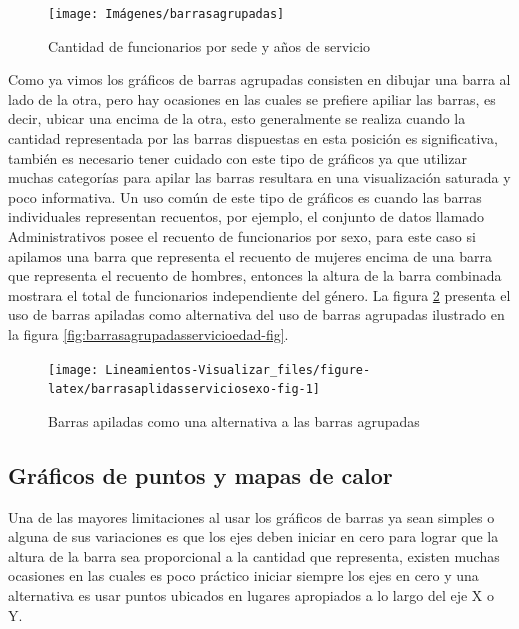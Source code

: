 \documentclass[
]{book}
\begin{document}
\begin{figure}

{\centering \texttt{[image: Imágenes/barrasagrupadas]} 

}

\caption{Cantidad de funcionarios por sede y años de servicio}\label{fig:barrasagrupadassedeservicio-fig}
\end{figure}

Como ya vimos los gráficos de barras agrupadas consisten en dibujar una barra al lado de la otra, pero hay ocasiones en las cuales se prefiere apiliar las barras, es decir, ubicar una encima de la otra, esto generalmente se realiza cuando la cantidad representada por las barras dispuestas en esta posición es significativa, también es necesario tener cuidado con este tipo de gráficos ya que utilizar muchas categorías para apilar las barras resultara en una visualización saturada y poco informativa. Un uso común de este tipo de gráficos es cuando las barras individuales representan recuentos, por ejemplo, el conjunto de datos llamado Administrativos posee el recuento de funcionarios por sexo, para este caso si apilamos una barra que representa el recuento de mujeres encima de una barra que representa el recuento de hombres, entonces la altura de la barra combinada mostrara el total de funcionarios independiente del género. La figura \ref{fig:barrasaplidasserviciosexo-fig} presenta el uso de barras apiladas como alternativa del uso de barras agrupadas ilustrado en la figura \ref{fig:barrasagrupadasservicioedad-fig}.

\begin{figure}

{\centering \texttt{[image: Lineamientos-Visualizar\_files/figure-latex/barrasaplidasserviciosexo-fig-1]} 

}

\caption{Barras apiladas como una alternativa a las barras agrupadas}\label{fig:barrasaplidasserviciosexo-fig}
\end{figure}

\hypertarget{gruxe1ficos-de-puntos-y-mapas-de-calor}{%
\subsection{Gráficos de puntos y mapas de calor}\label{gruxe1ficos-de-puntos-y-mapas-de-calor}}

Una de las mayores limitaciones al usar los gráficos de barras ya sean simples o alguna de sus variaciones es que los ejes deben iniciar en cero para lograr que la altura de la barra sea proporcional a la cantidad que representa, existen muchas ocasiones en las cuales es poco práctico iniciar siempre los ejes en cero y una alternativa es usar puntos ubicados en lugares apropiados a lo largo del eje X o Y.
\end{document}
